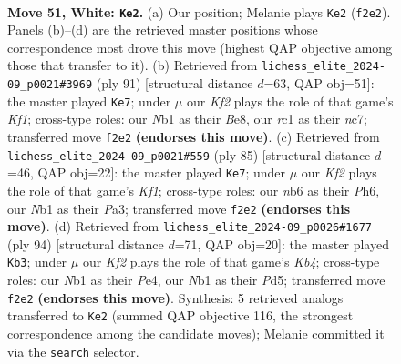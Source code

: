 \documentclass[11pt]{article}
\begin{document}
\clearpage

\begin{figure}[p]\centering
\begin{subfigure}{0.46\textwidth}\centering
\resizebox{\linewidth}{!}{%
\newchessgame
\chessboard[
  setfen={8/5pkp/1n4p1/p3p1P1/P3P3/1P4RP/5KP1/RNr4r w - - 16 51},
  showmover=false,
  pgfstyle=straightmove, color=movearrow, markmove={f2-e2}
]}
\caption{}
\end{subfigure}\hfill
\begin{subfigure}{0.46\textwidth}\centering
\resizebox{\linewidth}{!}{%
\newchessgame
\chessboard[
  setfen={3Rbkr1/p1N5/1p5r/2p2p2/2P1p1p1/1PK1P3/P4P1p/3R4 b - - 1 46},
  showmover=false,
  pgfstyle=straightmove, color=movearrow, markmove={f8-e7}
]}
\caption{}
\end{subfigure}
\\[4pt]
\begin{subfigure}{0.46\textwidth}\centering
\resizebox{\linewidth}{!}{%
\newchessgame
\chessboard[
  setfen={r4k2/5pp1/r3p2p/3p3P/3P4/p3P1P1/R4PK1/R7 b - - 2 43},
  showmover=false,
  pgfstyle=straightmove, color=movearrow, markmove={f8-e7}
]}
\caption{}
\end{subfigure}\hfill
\begin{subfigure}{0.46\textwidth}\centering
\resizebox{\linewidth}{!}{%
\newchessgame
\chessboard[
  setfen={8/2r3p1/1p1k1p2/1P1Pr2p/1K2P3/6P1/3RR1P1/8 w - - 4 48},
  showmover=false,
  pgfstyle=straightmove, color=movearrow, markmove={b4-b3}
]}
\caption{}
\end{subfigure}
\caption{\textbf{Move 51, White: \texttt{Ke2}.} (a) Our position; Melanie plays \texttt{Ke2} (\texttt{f2e2}). Panels (b)--(d) are the retrieved master positions whose correspondence most drove this move (highest QAP objective among those that transfer to it). (b) Retrieved from \texttt{lichess\_elite\_2024-09\_p0021\#3969} (ply 91) [structural distance $d$=63, QAP obj=51]: the master played \texttt{Ke7}; under $\mu$ our \emph{Kf2} plays the role of that game's \emph{Kf1}; cross-type roles: our \emph{N}b1 as their \emph{B}e8, our \emph{r}c1 as their \emph{n}c7; transferred move \texttt{f2e2} \textbf{(endorses this move)}. (c) Retrieved from \texttt{lichess\_elite\_2024-09\_p0021\#559} (ply 85) [structural distance $d$=46, QAP obj=22]: the master played \texttt{Ke7}; under $\mu$ our \emph{Kf2} plays the role of that game's \emph{Kf1}; cross-type roles: our \emph{n}b6 as their \emph{P}h6, our \emph{N}b1 as their \emph{P}a3; transferred move \texttt{f2e2} \textbf{(endorses this move)}. (d) Retrieved from \texttt{lichess\_elite\_2024-09\_p0026\#1677} (ply 94) [structural distance $d$=71, QAP obj=20]: the master played \texttt{Kb3}; under $\mu$ our \emph{Kf2} plays the role of that game's \emph{Kb4}; cross-type roles: our \emph{N}b1 as their \emph{P}e4, our \emph{N}b1 as their \emph{P}d5; transferred move \texttt{f2e2} \textbf{(endorses this move)}. Synthesis: 5 retrieved analogs transferred to \texttt{Ke2} (summed QAP objective 116, the strongest correspondence among the candidate moves); Melanie committed it via the \texttt{search} selector.}
\label{fig:thought-m100}
\end{figure}
\end{document}
